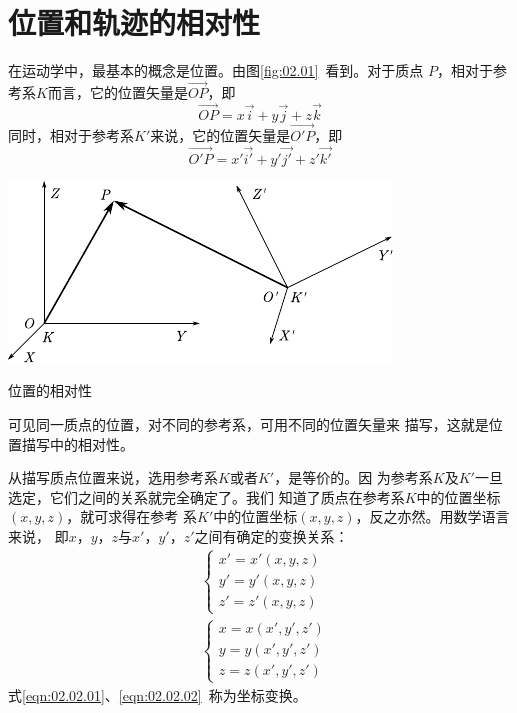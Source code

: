 \section{位置和轨迹的相对性}\label{sec:02.02}
在运动学中，最基本的概念是位置。由图\ref{fig:02.01}~看到。对于质点
$P$，相对于参考系$K$而言，它的位置矢量是$\vec{OP}$，即
\begin{equation*}
    \vec{OP}=x\vec{i}+y\vec{j}+z\vec{k}
\end{equation*}
同时，相对于参考系$K'$来说，它的位置矢量是$\vec{O'P}$，即
\begin{equation*}
    \vec{O'P}=x'\vec{i'}+y'\vec{j'}+z'\vec{k'}
\end{equation*}
\begin{figurex}
    \centering
    \includegraphics{figure/fig02.01}
    \caption{位置的相对性}
    \label{fig:02.01}
\end{figurex}

可见同一质点的位置，对不同的参考系，可用不同的位置矢量来
描写，这就是位置描写中的相对性。

从描写质点位置来说，选用参考系$ K $或者$ K' $，是等价的。因
为参考系$K$及$K'$一旦选定，它们之间的关系就完全确定了。我们
知道了质点在参考系$K$中的位置坐标$(x,y,z)$，就可求得在参考
系$K'$中的位置坐标$(x,y,z)$，反之亦然。用数学语言来说，
即$x$，$y$，$z$与$x'$，$y'$，$z'$之间有确定的变换关系：
\begin{align}
    \label{eqn:02.02.01}
    &\left\{\begin{array}{l}
        x'=x'(x, y, z) \\
        y'=y'(x, y, z) \\
        z'=z'(x, y, z)
    \end{array}\right. \\
    \label{eqn:02.02.02}
    &\left\{\begin{array}{l}
    x=x(x', y', z') \\
    y=y(x', y', z') \\
    z=z(x', y', z')
    \end{array}\right.
\end{align}
式\eqref{eqn:02.02.01}、\eqref{eqn:02.02.02}~称为坐标变换。

